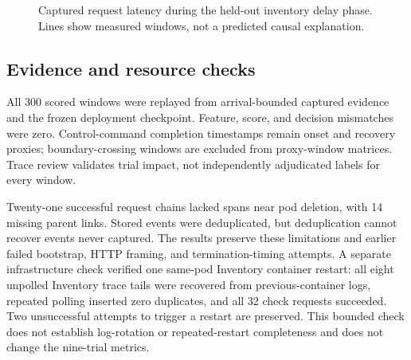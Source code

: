 \documentclass[conference]{IEEEtran}
\begin{document}
\begin{figure}[t]\centering
{}
\caption{Captured request latency during the held-out inventory delay phase. Lines show measured windows, not a predicted causal explanation.}\label{fig:latency}
\end{figure}

\subsection{Evidence and resource checks}
All 300 scored windows were replayed from arrival-bounded captured evidence and the frozen deployment checkpoint. Feature, score, and decision mismatches were zero. Control-command completion timestamps remain onset and recovery proxies; boundary-crossing windows are excluded from proxy-window matrices. Trace review validates trial impact, not independently adjudicated labels for every window.

Twenty-one successful request chains lacked spans near pod deletion, with 14 missing parent links. Stored events were deduplicated, but deduplication cannot recover events never captured. The results preserve these limitations and earlier failed bootstrap, HTTP framing, and termination-timing attempts. A separate infrastructure check verified one same-pod Inventory container restart: all eight unpolled Inventory trace tails were recovered from previous-container logs, repeated polling inserted zero duplicates, and all 32 check requests succeeded. Two unsuccessful attempts to trigger a restart are preserved. This bounded check does not establish log-rotation or repeated-restart completeness and does not change the nine-trial metrics.
\end{document}
